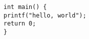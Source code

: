 \documentclass{article}
\begin{document}
\begin{verbatim}
int main() {
printf("hello, world");
return 0;
}
\end{verbatim}
\end{document}
